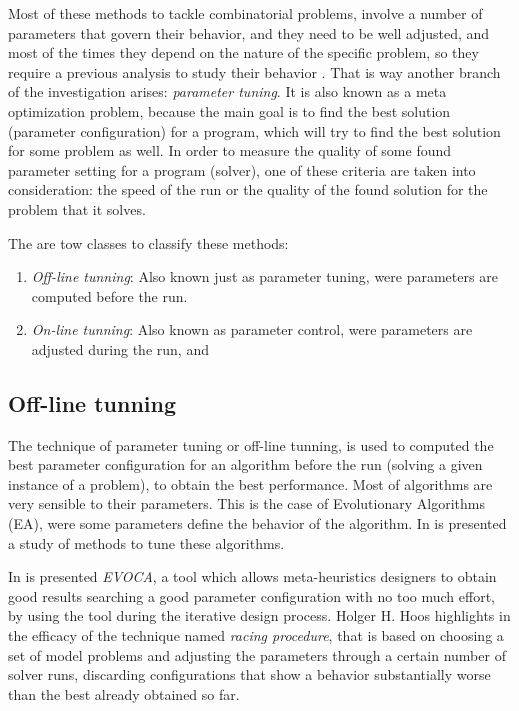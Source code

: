 Most of these methods to tackle combinatorial problems, involve a number of parameters that govern their behavior, and they need to be well adjusted, and most of the times they depend on the nature of the specific problem, so they require a previous analysis to study their behavior \cite{Birattari2005}. That is way another branch of the investigation arises: {\it parameter tuning}. It is also known as a meta optimization problem, because the main goal is to find the best solution (parameter configuration) for a program, which will try to find the best solution for some problem as well. In order to measure the quality of some found parameter setting for a program (solver), one of these criteria are taken into consideration: the speed of the run or the quality of the found solution for the problem that it solves.

The are tow classes to classify these methods: 
\begin{enumerate}
\item \textit{Off-line tunning}: Also known just as parameter tuning, were parameters are computed before the run.
\item \textit{On-line tunning}: Also known as parameter control, were parameters are adjusted during the run, and
\end{enumerate}

\subsection{Off-line tunning}

The technique of parameter tuning or off-line tunning, is used to computed the best parameter configuration for an algorithm before the run (solving a given instance of a problem), to obtain the best performance. Most of algorithms are very sensible to their parameters. This is the case of Evolutionary Algorithms (EA), were some parameters define the behavior of the algorithm. In \cite{A.E.Eiben2012} is presented a study of methods to tune these algorithms.

In \cite{Riff2013} is presented \textit{EVOCA}, a tool which allows meta-heuristics designers to obtain good results searching a good parameter configuration with no too much effort, by using the tool during the iterative design process. Holger H. Hoos highlights in \cite{Hoos2012} the efficacy of the technique named {\it racing procedure}, that is based on choosing a set of model problems and adjusting the parameters through a certain number of solver runs, discarding configurations that show a behavior substantially worse than the best already obtained so far. 

